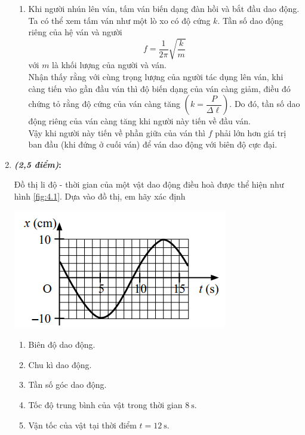 \begin{enumerate}[label=\bfseries Câu \arabic*]
{\begin{enumerate}[label=\alph*)]
	\item Khi người nhún lên ván, tấm ván biến dạng đàn hồi và bắt đầu dao động. Ta có thể xem tấm ván như một lò xo có độ cứng $k$. Tần số dao động riêng của hệ ván và người
	$$f=\dfrac{1}{2\pi}\sqrt{\dfrac{k}{m}}$$
	với $m$ là khối lượng của người và ván.\\
	Nhận thấy rằng với cùng trọng lượng của người tác dụng lên ván, khi càng tiến vào gần đầu ván thì độ biến dạng của ván càng giảm, điều đó chứng tỏ rằng độ cứng của ván càng tăng $\left(k=\dfrac{P}{\Delta\ell}\right)$. Do đó, tần số dao động riêng của ván càng tăng khi người này tiến về đầu ván.\\
	Vậy khi người này tiến về phần giữa của ván thì $f$ phải lớn hơn giá trị ban đầu (khi đứng ở cuối ván) để ván dao động với biên độ cực đại.
\end{enumerate}
}
	\item \textbf{\textit{(2,5 điểm)}:}\\
	{Đồ thị li độ - thời gian của một vật dao động điều hoà được thể hiện như hình \ref{fig:4.1}. Dựa vào đồ thị, em hãy xác định
	\begin{center}
		\includegraphics[width=0.45\linewidth]{../figs/D11-4-2}
		\label{fig:4.1}
	\end{center}
\begin{enumerate}[label=\alph*)]
	\item Biên độ dao động.
	\item Chu kì dao động.
	\item Tần số góc dao động.
	\item Tốc độ trung bình của vật trong thời gian $\SI{8}{\second}$.
	\item Vận tốc của vật tại thời điểm $t=\SI{12}{\second}$.
\end{enumerate}}
\end{enumerate}
